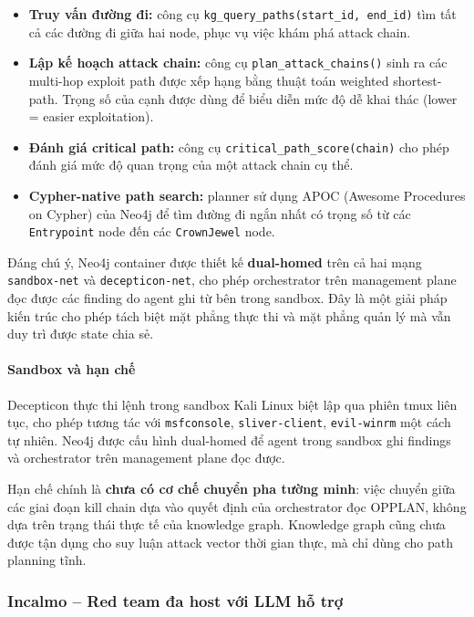 \begin{itemize}
    \item \textbf{Truy vấn đường đi:} công cụ \texttt{kg\_query\_paths(start\_id, end\_id)} tìm tất cả các đường đi giữa hai node, phục vụ việc khám phá attack chain.
    \item \textbf{Lập kế hoạch attack chain:} công cụ \texttt{plan\_attack\_chains()} sinh ra các multi-hop exploit path được xếp hạng bằng thuật toán weighted shortest-path. Trọng số của cạnh được dùng để biểu diễn mức độ dễ khai thác (lower = easier exploitation).
    \item \textbf{Đánh giá critical path:} công cụ \texttt{critical\_path\_score(chain)} cho phép đánh giá mức độ quan trọng của một attack chain cụ thể.
    \item \textbf{Cypher-native path search:} planner sử dụng APOC (Awesome Procedures on Cypher) của Neo4j để tìm đường đi ngắn nhất có trọng số từ các \texttt{Entrypoint} node đến các \texttt{CrownJewel} node.
\end{itemize}

Đáng chú ý, Neo4j container được thiết kế \textbf{dual-homed} trên cả hai mạng \texttt{sandbox-net} và \texttt{decepticon-net}, cho phép orchestrator trên management plane đọc được các finding do agent ghi từ bên trong sandbox. Đây là một giải pháp kiến trúc cho phép tách biệt mặt phẳng thực thi và mặt phẳng quản lý mà vẫn duy trì được state chia sẻ.

\paragraph{Sandbox và hạn chế}

Decepticon thực thi lệnh trong sandbox Kali Linux biệt lập qua phiên tmux liên tục, cho phép tương tác với \texttt{msfconsole}, \texttt{sliver-client}, \texttt{evil-winrm} một cách tự nhiên. Neo4j được cấu hình dual-homed để agent trong sandbox ghi findings và orchestrator trên management plane đọc được.

Hạn chế chính là \textbf{chưa có cơ chế chuyển pha tường minh}: việc chuyển giữa các giai đoạn kill chain dựa vào quyết định của orchestrator đọc OPPLAN, không dựa trên trạng thái thực tế của knowledge graph. Knowledge graph cũng chưa được tận dụng cho suy luận attack vector thời gian thực, mà chỉ dùng cho path planning tĩnh.

\subsubsection{Incalmo -- Red team đa host với LLM hỗ trợ}

